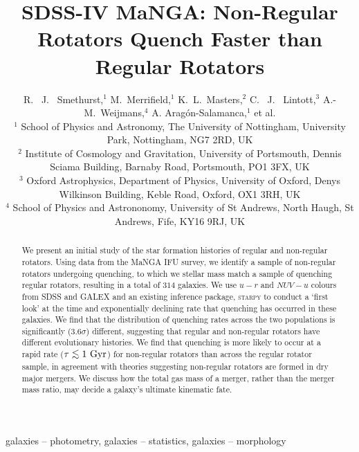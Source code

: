 \documentclass[useAMS,usenatbib]{mn2e}
\def\lesssim{\mathrel{\hbox{\rlap{\hbox{\lower3pt\hbox{$\sim$}}}\hbox{\raise2pt\hbox{$<$}}}}}
\begin{document}
\title[Quenching Histories of Regular and Non-Regular Rotators]{SDSS-IV MaNGA: Non-Regular Rotators Quench Faster than Regular Rotators}
\author[Smethurst et al. 2017]{R. ~J. ~Smethurst,$^{1}$ M.~Merrifield,$^{1}$ K.~L.~Masters,$^{2}$  C. ~J. ~Lintott,$^{3}$ \newauthor A.-M.~Weijmans,$^{4}$ A. Arag\'on-Salamanca,$^{1}$ et al.
\\ $^1$ School of Physics and Astronomy, The University of Nottingham, University Park, Nottingham, NG7 2RD, UK
\\ $^2$ Institute of Cosmology and Gravitation, University of Portsmouth, Dennis Sciama Building, Barnaby Road, Portsmouth, PO1 3FX, UK 
\\ $^3$ Oxford Astrophysics, Department of Physics, University of Oxford, Denys Wilkinson Building, Keble Road, Oxford, OX1 3RH, UK
\\ $^4$ School of Physics and Astrononomy, University of St Andrews, North Haugh, St Andrews, Fife, KY16 9RJ, UK
}

\maketitle

\begin{abstract}
We present an initial study of the star formation histories of regular and non-regular rotators. Using data from the MaNGA IFU survey, we identify a sample of non-regular rotators undergoing quenching, to which we stellar mass match a sample of quenching regular rotators, resulting in a total of $314$ galaxies. We use $u-r$ and $NUV-u$ colours from SDSS and GALEX and an existing inference package, \textsc{starpy} to conduct a `first look' at the time and exponentially declining rate that quenching has occurred in these galaxies. We find that the distribution of quenching rates across the two populations is significantly ($3.6\sigma$) different, suggesting that regular and non-regular rotators have different evolutionary histories. We find that quenching is more likely to occur at a rapid rate ($\tau \lesssim 1~\rm{Gyr}$) for non-regular rotators than across the regular rotator sample, in agreement with theories suggesting non-regular rotators are formed in dry major mergers.  We discuss how the total gas mass of a merger, rather than the merger mass ratio, may decide a galaxy's ultimate kinematic fate. 
\end{abstract}

\begin{keywords}
galaxies -- photometry, galaxies -- statistics, galaxies -- morphology
\end{keywords}
\end{document}
